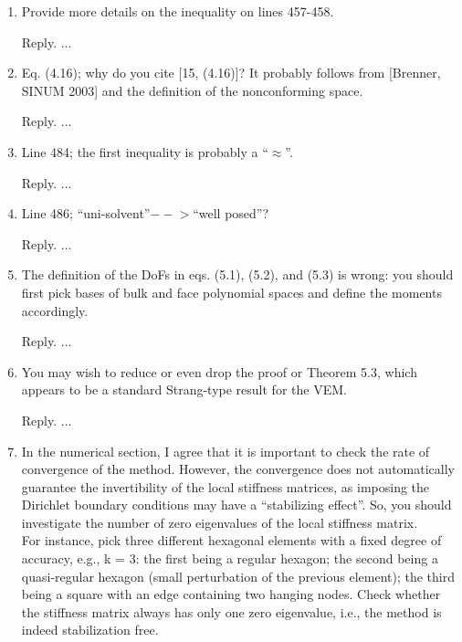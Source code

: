 \documentclass[10pt]{amsart}
\theoremstyle{definition}
\theoremstyle{remark}
\begin{document}
\begin{enumerate}[1.]
\medskip

\item \textsf{Provide more details on the inequality on lines 457-458.}

\smallskip \noindent \textcolor[rgb]{1.00,0.00,0.00}{Reply.}
...

\medskip

\item \textsf{Eq. (4.16); why do you cite [15, (4.16)]? It probably follows from [Brenner, SINUM 2003] and the definition of the nonconforming space.}

\smallskip \noindent \textcolor[rgb]{1.00,0.00,0.00}{Reply.}
...

\medskip

\item \textsf{Line 484; the first inequality is probably a “$\approx$”.}

\smallskip \noindent \textcolor[rgb]{1.00,0.00,0.00}{Reply.}
...

\medskip

\item \textsf{Line 486; “uni-solvent”$-\!\!\!-\!\!\!>$“well posed”?}

\smallskip \noindent \textcolor[rgb]{1.00,0.00,0.00}{Reply.}
...

\medskip

\item \textsf{The definition of the DoFs in eqs. (5.1), (5.2), and (5.3) is wrong: you should first pick bases of bulk and face polynomial spaces and define the moments accordingly.}

\smallskip \noindent \textcolor[rgb]{1.00,0.00,0.00}{Reply.}
...

\medskip

\item \textsf{You may wish to reduce or even drop the proof or Theorem 5.3, which appears to be a standard Strang-type result for the VEM.}

\smallskip \noindent \textcolor[rgb]{1.00,0.00,0.00}{Reply.}
...

\medskip

\item \textsf{In the numerical section, I agree that it is important to check the rate of convergence of the method.
However, the convergence does not automatically guarantee the invertibility of the local stiffness matrices, as imposing the Dirichlet boundary conditions may have a “stabilizing effect”. So, you should investigate the number of zero eigenvalues of the local stiffness matrix.\\
For instance, pick three different hexagonal elements with a fixed degree of accuracy, e.g., k = 3: the first being a regular hexagon; the second being a quasi-regular hexagon (small perturbation of the previous element); the third being a square with an edge containing two hanging nodes. Check whether the stiffness matrix always has only one zero eigenvalue, i.e., the method is indeed stabilization free.}


\end{enumerate}
\end{document}
